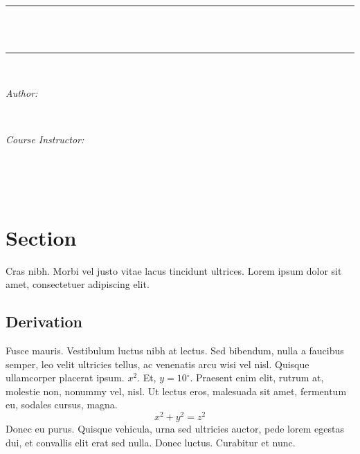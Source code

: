 \documentclass[11pt]{article}
\newcommand{\degrees}{\ensuremath{^\circ}}
\begin{document}
  
  \begin{titlepage}
    \newcommand{\HRule}{\rule{\linewidth}{0.5mm}}
    \center
    \textsc{\LARGE \School}\\[1.5cm]
    \textsc{\Large \Class}\\[0.3cm]
    \HRule \\[0.4cm]
    { \huge \bfseries \Assignment}\\[0.1cm] 
    \HRule \\[1.5cm]
    \begin{minipage}{0.4\textwidth}
      \begin{flushleft} \large
        \emph{Author:}\\
        \Name
        \end{flushleft}
        \end{minipage}
        ~
        \begin{minipage}{0.4\textwidth}
        \begin{flushright} \large
        \emph{Course Instructor:} \\
        \Professor \\
      \end{flushright}
    \end{minipage}
      \\[1cm]
    {\large \Duedate}\\[3cm]
    \vfill
  \end{titlepage}

  \newpage 
  \begin{abstract}
    \lipsum[1-3]
  \end{abstract}

  \newpage 
  \tableofcontents
  \listoffigures

  \newpage
  \section{Section}
  Cras nibh. Morbi vel justo vitae lacus tincidunt ultrices. Lorem ipsum dolor sit amet, consectetuer adipiscing elit.
  \subsection{Derivation}
  Fusce mauris. Vestibulum luctus nibh at lectus. Sed bibendum, nulla a faucibus semper, leo velit ultricies tellus, ac venenatis arcu wisi vel nisl. 
  Quisque ullamcorper placerat ipsum. $x^2$. Et, $y = 10\degrees$.
  Praesent enim elit, rutrum at, molestie non, nonummy vel, nisl. Ut lectus eros, malesuada sit amet, fermentum eu, sodales cursus, magna.
  $$ x^2 + y^2 = z^2 $$
  Donec eu purus. Quisque vehicula, urna sed ultricies auctor, pede lorem egestas dui, et convallis elit erat sed nulla. Donec luctus. Curabitur et nunc.
  
\end{document}
